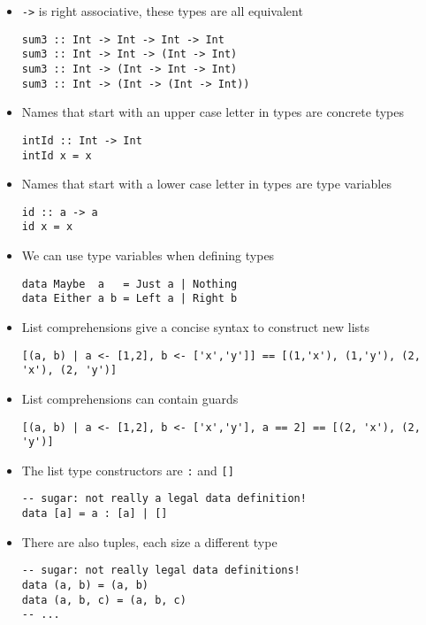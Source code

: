 \begin{itemize}
\item \verb|->| is right associative, these types are all equivalent
\begin{verbatim}
sum3 :: Int -> Int -> Int -> Int
sum3 :: Int -> Int -> (Int -> Int)
sum3 :: Int -> (Int -> Int -> Int)
sum3 :: Int -> (Int -> (Int -> Int))
\end{verbatim}

\item Names that start with an upper case letter in types are concrete
  types
\begin{verbatim}
intId :: Int -> Int
intId x = x
\end{verbatim}

\item Names that start with a lower case letter in types are type
  variables
\begin{verbatim}
id :: a -> a
id x = x
\end{verbatim}

\item We can use type variables when defining types
\begin{verbatim}
data Maybe  a   = Just a | Nothing
data Either a b = Left a | Right b
\end{verbatim}

\item List comprehensions give a concise syntax to construct new lists
\begin{verbatim}
[(a, b) | a <- [1,2], b <- ['x','y']] == [(1,'x'), (1,'y'), (2, 'x'), (2, 'y')]
\end{verbatim}

\item List comprehensions can contain guards
\begin{verbatim}
[(a, b) | a <- [1,2], b <- ['x','y'], a == 2] == [(2, 'x'), (2, 'y')]
\end{verbatim}

\item The list type constructors are \verb|:| and \verb|[]|
\begin{verbatim}
-- sugar: not really a legal data definition!
data [a] = a : [a] | []
\end{verbatim}

\item There are also tuples, each size a different type
\begin{verbatim}
-- sugar: not really legal data definitions!
data (a, b) = (a, b)
data (a, b, c) = (a, b, c)
-- ...
\end{verbatim}


\end{itemize}
